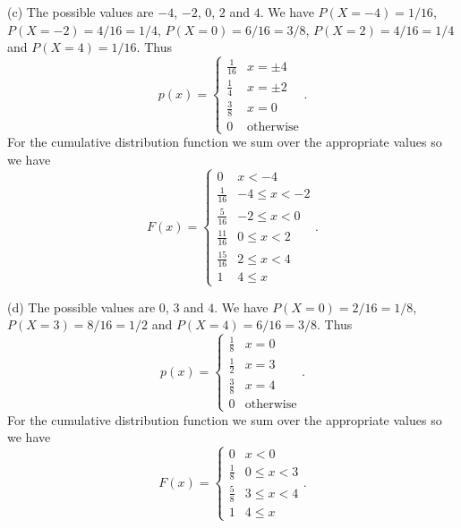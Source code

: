 \documentclass{article}
\begin{document}
(c) The possible values are $-4$, $-2$, $0$, $2$ and $4$. We have $P(X = -4) = 1/16$, $P(X = -2) = 4/16 = 1/4$, $P(X = 0) = 6/16 = 3/8$, $P(X = 2) = 4/16 = 1/4$ and $P(X = 4) = 1/16$. Thus
\[
p(x) =
\begin{cases}
\frac{1}{16} & x = \pm 4\\
\frac{1}{4} & x = \pm 2\\
\frac{3}{8} & x = 0\\
0 & \text{otherwise}
\end{cases}.
\]
For the cumulative distribution function we sum over the appropriate values so we have
\[
F(x) =
\begin{cases}
0 & x < -4\\
\frac{1}{16} & -4 \leq x < -2\\
\frac{5}{16} & -2 \leq x < 0\\
\frac{11}{16} & 0 \leq x < 2\\
\frac{15}{16} & 2 \leq x < 4\\
1 & 4 \leq x
\end{cases}.
\]

(d) The possible values are $0$, $3$ and $4$. We have $P(X = 0) = 2/16 = 1/8$, $P(X = 3) = 8/16 = 1/2$ and $P(X = 4) = 6/16 = 3/8$. Thus
\[
p(x) =
\begin{cases}
\frac{1}{8} & x = 0\\
\frac{1}{2} & x = 3\\
\frac{3}{8} & x = 4\\
0 & \text{otherwise}
\end{cases}.
\]
For the cumulative distribution function we sum over the appropriate values so we have
\[
F(x) =
\begin{cases}
0 & x < 0\\
\frac{1}{8} & 0 \leq x < 3\\
\frac{5}{8} & 3 \leq x < 4\\
1 & 4 \leq x
\end{cases}.
\]
\end{document}
